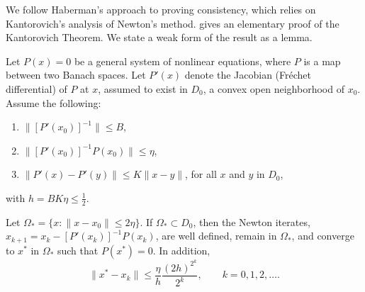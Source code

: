 \documentclass[final]{statsoc}
\begin{document}
We follow Haberman's \citeyearpar{haberman1977maximum} approach to proving
consistency, which relies on Kantorovich's \citeyearpar{kantorovich1952functional} analysis
of Newton's method.  \citet{tapia1971kantorovich} gives an elementary proof of the Kantorovich
Theorem.
We state a weak form of the result as a lemma.

\begin{lemma}\label{L:kantorovich}
    Let $P(x) = 0$ be a general system of nonlinear equations, where $P$ is
    a map between two Banach spaces.  Let $P'(x)$ denote the Jacobian
    (Fr\'echet differential) of $P$ at $x$, assumed to exist in $D_0$,
    a convex open neighborhood of $x_0$.  Assume the following:
    \begin{enumerate}
        \item $\| [P'(x_0)]^{-1} \| \leq B$,
        \item $\| [P'(x_0)]^{-1} P(x_0) \| \leq \eta$,
        \item $\| P'(x) - P'(y) \| \leq K \| x - y \|$,\quad
            for all $x$ and $y$ in $D_0$,
    \end{enumerate}
    with $h = B K \eta \leq \tfrac{1}{2}$.

    Let $\Omega_\ast = \{ x : \| x - x_0 \| \leq 2 \eta \}$.
    If $\Omega_\ast \subset D_0$, then the Newton iterates,
    $x_{k+1} = x_k - [P'(x_k)]^{-1} P(x_k)$, are well defined, remain
    in $\Omega_\ast$, and converge to $x^\ast$ in $\Omega_\ast$ such
    that $P(x^\ast) = 0$.  In addition,
    \[
        \| x^\ast - x_k \|
            \leq
                \frac{\eta}{h}
                \frac{(2h)^{2^k}}{2^k},
        \qquad
        k = 0, 1, 2, \ldots.
    \]
\end{lemma}
\end{document}
